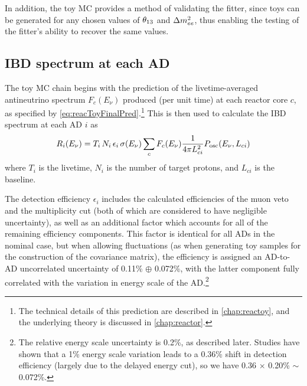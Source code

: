 \documentclass[../thesis.tex]{subfiles}
\begin{document}
In addition, the toy MC provides a method of validating the fitter, since toys can be generated for any chosen values of $\theta_{13}$ and $\Delta m^2_{ee}$, thus enabling the testing of the fitter's ability to recover the same values.

\begin{comment}
  The toy MC also generates a ``PredictedIBD'' file which contains the background-free no-oscillation IBD spectra of each detector. As far as I can tell, this is only used in order to calculate a `summed' covariance matrix in which the matrices of the three stages (6, 8, 7AD) are combined, with the weighting determined by the PredictedIBD counts. (Oscillations shouldn't affect this weighting between ADs in the same hall, or the weighting between different stages.) In turn, the summed matrix is not used during the fit, but is only produced as a diagnostic. 
\end{comment}

\subsection{IBD spectrum at each AD}
\label{sec:fitToyFluxPred}

The toy MC chain begins with the prediction of the livetime-averaged antineutrino spectrum $F_c(E_\nu)$ produced (per unit time) at each reactor core $c$, as specified by \autoref{eq:reacToyFinalPred}.\footnote{The technical details of this prediction are described in \autoref{chap:reactoy}, and the underlying theory is discussed in \autoref{chap:reactor}.} This is then used to calculate the IBD spectrum at each AD $i$ as
\begin{equation}
  \label{eq:fitTrueIbdSpec}
  R_i(E_\nu) = T_i\,N_i\,\epsilon_i\,\sigma(E_\nu) \sum_c F_c(E_\nu) \frac{1}{4\pi L_{ci}^2}
  P_\mathrm{osc}(E_\nu, L_{ci})
\end{equation}
where $T_i$ is the livetime, $N_i$ is the number of target protons, and $L_{ci}$ is the baseline.

The detection efficiency $\epsilon_i$ includes the calculated efficiencies of the muon veto and the multiplicity cut (both of which are considered to have negligible uncertainty), as well as an additional factor which accounts for all of the remaining efficiency components. This factor is identical for all ADs in the nominal case, but when allowing fluctuations (as when generating toy samples for the construction of the covariance matrix), the efficiency is assigned an AD-to-AD uncorrelated uncertainty of 0.11\% $\oplus$ 0.072\%, with the latter component fully correlated with the variation in energy scale of the AD.\footnote{The relative energy scale uncertainty is 0.2\%, as described later. Studies have shown \cite{P15A_inputs} that a 1\% energy scale variation leads to a 0.36\% shift in detection efficiency (largely due to the delayed energy cut), so we have 0.36 $\times$ 0.20\% $\sim$ 0.072\%.}
\end{document}
